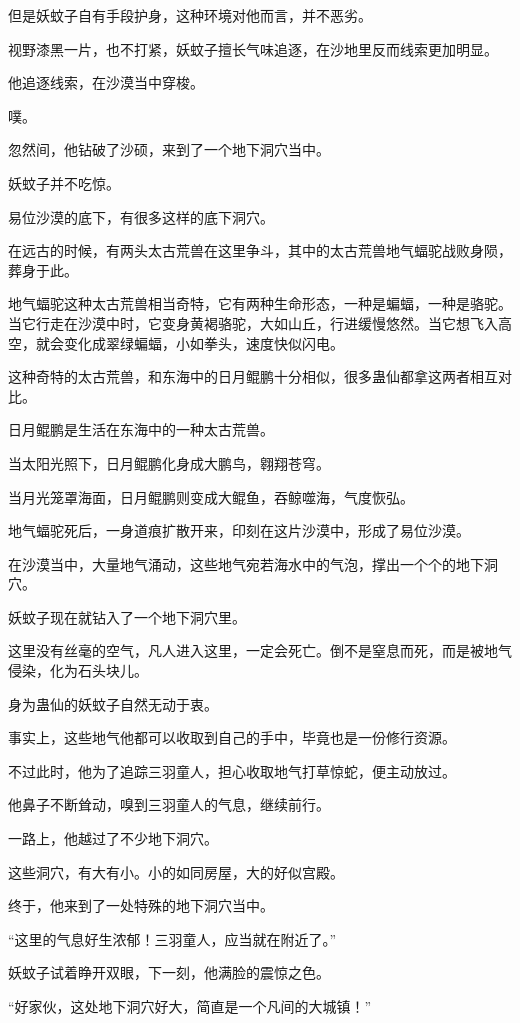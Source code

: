 \begin{this_body}
但是妖蚊子自有手段护身，这种环境对他而言，并不恶劣。

视野漆黑一片，也不打紧，妖蚊子擅长气味追逐，在沙地里反而线索更加明显。

他追逐线索，在沙漠当中穿梭。

噗。

忽然间，他钻破了沙硕，来到了一个地下洞穴当中。

妖蚊子并不吃惊。

易位沙漠的底下，有很多这样的底下洞穴。

在远古的时候，有两头太古荒兽在这里争斗，其中的太古荒兽地气蝠驼战败身陨，葬身于此。

地气蝠驼这种太古荒兽相当奇特，它有两种生命形态，一种是蝙蝠，一种是骆驼。当它行走在沙漠中时，它变身黄褐骆驼，大如山丘，行进缓慢悠然。当它想飞入高空，就会变化成翠绿蝙蝠，小如拳头，速度快似闪电。

这种奇特的太古荒兽，和东海中的日月鲲鹏十分相似，很多蛊仙都拿这两者相互对比。

日月鲲鹏是生活在东海中的一种太古荒兽。

当太阳光照下，日月鲲鹏化身成大鹏鸟，翱翔苍穹。

当月光笼罩海面，日月鲲鹏则变成大鲲鱼，吞鲸噬海，气度恢弘。

地气蝠驼死后，一身道痕扩散开来，印刻在这片沙漠中，形成了易位沙漠。

在沙漠当中，大量地气涌动，这些地气宛若海水中的气泡，撑出一个个的地下洞穴。

妖蚊子现在就钻入了一个地下洞穴里。

这里没有丝毫的空气，凡人进入这里，一定会死亡。倒不是窒息而死，而是被地气侵染，化为石头块儿。

身为蛊仙的妖蚊子自然无动于衷。

事实上，这些地气他都可以收取到自己的手中，毕竟也是一份修行资源。

不过此时，他为了追踪三羽童人，担心收取地气打草惊蛇，便主动放过。

他鼻子不断耸动，嗅到三羽童人的气息，继续前行。

一路上，他越过了不少地下洞穴。

这些洞穴，有大有小。小的如同房屋，大的好似宫殿。

终于，他来到了一处特殊的地下洞穴当中。

“这里的气息好生浓郁！三羽童人，应当就在附近了。”

妖蚊子试着睁开双眼，下一刻，他满脸的震惊之色。

“好家伙，这处地下洞穴好大，简直是一个凡间的大城镇！”


\end{this_body}
